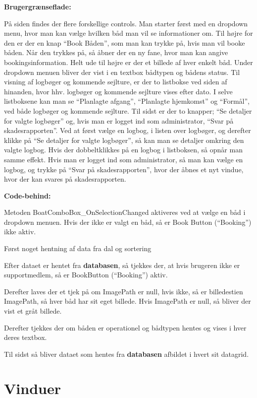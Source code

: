 \textbf{Brugergrænseflade:}

På siden findes der flere forskellige controls.
Man starter først med en dropdown menu, hvor man kan vælge hvilken båd man vil se informationer om.
Til højre for den er der en knap ``Book Båden'', som man kan trykke på, hvis man vil booke båden. Når den trykkes på, så åbner der en ny fane, hvor man kan angive bookingsinformation. 
Helt ude til højre er der et billede af hver enkelt båd. 
Under dropdown menuen bliver der vist i en textbox bådtypen og bådens status. 
Til visning af logbøger og kommende sejlture, er der to listbokse ved siden af hinanden, hvor hhv. logbøger og kommende sejlture vises efter dato. 
I selve listboksene kan man se ``Planlagte afgang'', ``Planlagte hjemkomst'' og ``Formål'', ved både logbøger og kommende sejlture. 
Til sidst er der to knapper; ``Se detaljer for valgte logbøger'' og, hvis man er logget ind som administrator, ``Svar på skadesrapporten''. Ved at først vælge en logbog, i listen over logbøger, og derefter klikke på ``Se detaljer for valgte logbøger'', så kan man se detaljer omkring den valgte logbog. 
Hvis der dobbeltklikkes på en logbog i listboksen, så opnår man samme effekt. 
Hvis man er logget ind som administrator, så man kan vælge en logbog, og trykke på ``Svar på skadesrapporten'', hvor der åbnes et nyt vindue, hvor der kan svares på skadesrapporten. 

\textbf{Code-behind:}

Metoden BoatComboBox\_OnSelectionChanged aktiveres ved at vælge en båd i dropdown menuen. 
Hvis der ikke er valgt en båd, så er Book Button (``Booking'') ikke aktiv. 

Først noget hentning af data fra dal og sortering

Efter dataet er hentet fra \textbf{databasen}, så tjekkes der, at hvis brugeren ikke er supportmedlem, så er BookButton (``Booking'') aktiv. 

Derefter laves der et tjek på om ImagePath er null, hvis ikke, så er billedestien ImagePath, så hver båd har sit eget billede. 
Hvis ImagePath er null, så bliver der vist et gråt billede.

Derefter tjekkes der om båden er operationel og bådtypen hentes og vises i hver deres textbox. 

Til sidst så bliver dataet som hentes fra \textbf{databasen} afbildet i hvert sit datagrid.


\section{Vinduer}


